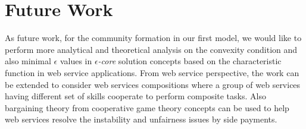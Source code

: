 



\section{Future Work}

As future work, for the community formation in our first model, we would like to perform more analytical and theoretical analysis on the convexity condition and also minimal
$\epsilon$ values in \emph{$\epsilon$-core} solution concepts based on the characteristic function in web service applications. From web service perspective, the work can be extended to consider web services compositions where a group of web services having different set of skills cooperate to perform composite tasks. Also bargaining theory from cooperative game theory concepts can be used to help web services resolve the instability and unfairness issues by side payments.

